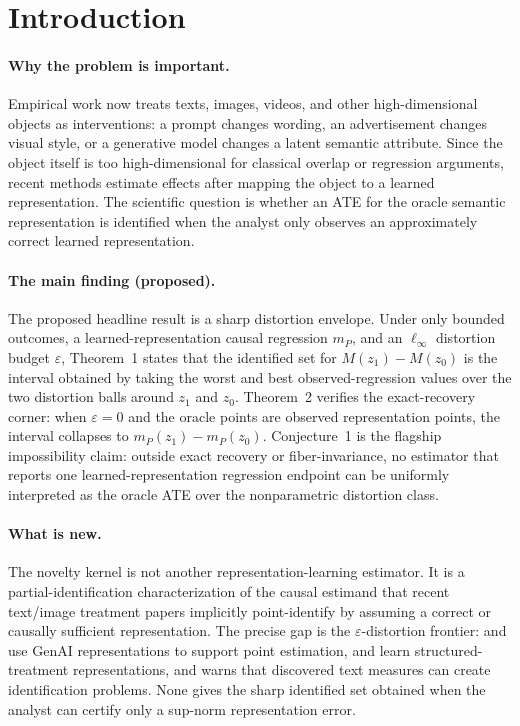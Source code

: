 \documentclass[11pt]{article}
\theoremstyle{definition}
\theoremstyle{plain}
\theoremstyle{remark}
\begin{document}
\section{Introduction}
\paragraph{Why the problem is important.}
Empirical work now treats texts, images, videos, and other high-dimensional objects as interventions: a prompt changes wording, an advertisement changes visual style, or a generative model changes a latent semantic attribute. Since the object itself is too high-dimensional for classical overlap or regression arguments, recent methods estimate effects after mapping the object to a learned representation. The scientific question is whether an ATE for the oracle semantic representation is identified when the analyst only observes an approximately correct learned representation.

\paragraph{The main finding (proposed).}
The proposed headline result is a sharp distortion envelope. Under only bounded outcomes, a learned-representation causal regression \(m_P\), and an \(\ell_\infty\) distortion budget \(\varepsilon\), Theorem~1 states that the identified set for \(M(z_1)-M(z_0)\) is the interval obtained by taking the worst and best observed-regression values over the two distortion balls around \(z_1\) and \(z_0\). Theorem~2 verifies the exact-recovery corner: when \(\varepsilon=0\) and the oracle points are observed representation points, the interval collapses to \(m_P(z_1)-m_P(z_0)\). Conjecture~1 is the flagship impossibility claim: outside exact recovery or fiber-invariance, no estimator that reports one learned-representation regression endpoint can be uniformly interpreted as the oracle ATE over the nonparametric distortion class.

\paragraph{What is new.}
The novelty kernel is not another representation-learning estimator. It is a partial-identification characterization of the causal estimand that recent text/image treatment papers implicitly point-identify by assuming a correct or causally sufficient representation. The precise gap is the \(\varepsilon\)-distortion frontier: \citet{ImaiNakamura2025GPI} and \citet{ImaiNakamura2024TextTreatments} use GenAI representations to support point estimation, \citet{KaddourZhuLiuKusnerSilva2021} and \citet{CorcollAndreuVlontzosORiordanGilliganLee2026} learn structured-treatment representations, and \citet{EgamiFongGrimmerRobertsStewart2022} warns that discovered text measures can create identification problems. None gives the sharp identified set obtained when the analyst can certify only a sup-norm representation error.
\end{document}
